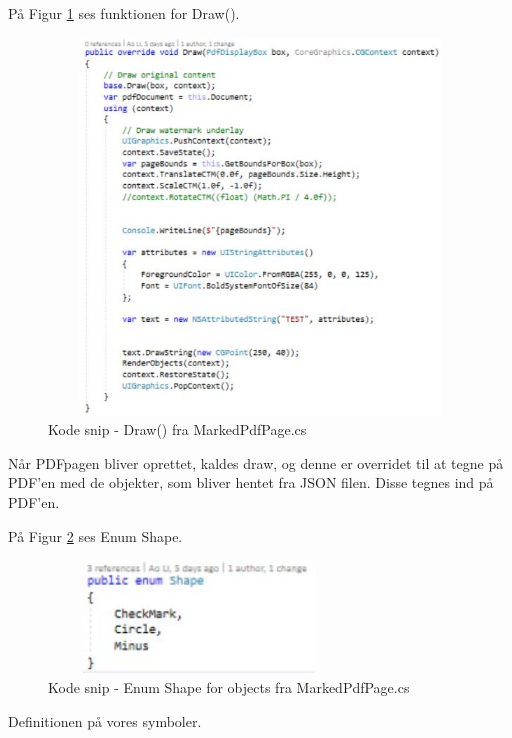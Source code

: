 På Figur \ref{fig:Draw} ses funktionen for Draw().
\begin{figure}[H] %
	\centering
	\includegraphics[height=10cm, width=15cm]{../ArkitekturDesign/Design/RegisterPDF/Draw}
	\caption{Kode snip - Draw() fra MarkedPdfPage.cs}
	\label{fig:Draw}
\end{figure}
Når PDFpagen bliver oprettet, kaldes draw, og denne er overridet til at tegne på PDF'en med de objekter, som bliver hentet fra JSON filen. Disse tegnes ind på PDF'en.

\clearpage

På Figur \ref{fig:Enum} ses Enum Shape.
\begin{figure}[H] %
	\centering
	\includegraphics[height=3cm, width=8cm]{../ArkitekturDesign/Design/RegisterPDF/Enum}
	\caption{Kode snip - Enum Shape for objects fra MarkedPdfPage.cs}
	\label{fig:Enum}
\end{figure}
Definitionen på vores symboler.

